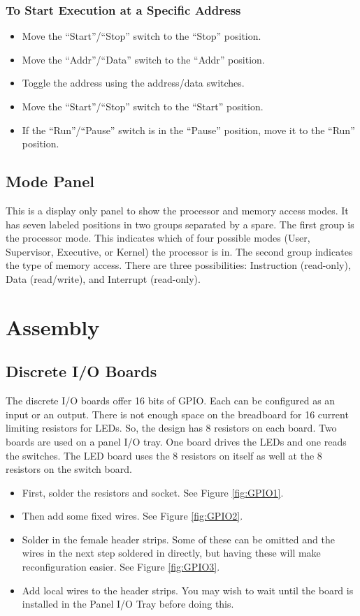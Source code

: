 \documentclass[10pt, openany]{book}
\newcommand{\switch}[2]{``#1''/``#2''}
\newcommand{\position}[1]{``#1''}
\begin{document}
\subsubsection{To Start Execution at a Specific Address}
\begin{itemize}
  \item Move the \switch{Start}{Stop} switch to the \position{Stop} position.
  \item Move the \switch{Addr}{Data} switch to the \position{Addr} position.
  \item Toggle the address using the address/data switches.
  \item Move the \switch{Start}{Stop} switch to the \position{Start} position.
  \item If the \switch{Run}{Pause} switch is in the \position{Pause} position, move it to the \position{Run} position.
\end{itemize}

\subsection{Mode Panel}
This is a display only panel to show the processor and memory access modes.  It has seven labeled positions in two groups separated by a spare.  The first group is the processor mode.  This indicates which of four possible modes (User, Supervisor, Executive, or Kernel) the processor is in.  The second group indicates the type of memory access.  There are three possibilities: Instruction (read-only), Data (read/write), and Interrupt (read-only).

\section{Assembly}

\subsection{Discrete I/O Boards}
The discrete I/O boards offer 16 bits of GPIO.  Each can be configured as an input or an output.  There is not enough space on the breadboard for 16 current limiting resistors for LEDs.  So, the design has 8 resistors on each board.  Two boards are used on a panel I/O tray.  One board drives the LEDs and one reads the switches.  The LED board uses the 8 resistors on itself as well at the 8 resistors on the switch board.
\begin{itemize}
  \item First, solder the resistors and socket.  See Figure \ref{fig:GPIO1}.
  \item Then add some fixed wires.  See Figure \ref{fig:GPIO2}.
  \item Solder in the female header strips.  Some of these can be omitted and the wires in the next step soldered in directly, but having these will make reconfiguration easier.  See Figure \ref{fig:GPIO3}.
  \item Add local wires to the header strips.  You may wish to wait until the board is installed in the Panel I/O Tray before doing this.
\end{itemize}
\end{document}
